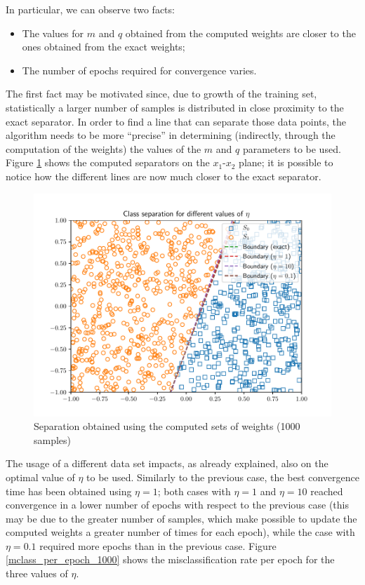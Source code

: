 \documentclass[letterpaper,headings=standardclasses]{scrartcl}
\begin{document}
In particular, we can observe two facts:

\begin{itemize}

\item The values for $m$ and $q$ obtained from the computed weights are closer to the ones obtained from the exact weights;

\item The number of epochs required for convergence varies.

\end{itemize}

The first fact may be motivated since, due to growth of the training set, statistically a larger number of samples is distributed in close proximity to the exact separator. In order to find a line that can separate those data points, the algorithm needs to be more “precise” in determining (indirectly, through the computation of the weights) the values of the $m$ and $q$ parameters to be used. Figure \ref{all_sep_1000} shows the computed separators on the $x_1$-$x_2$ plane; it is possible to notice how the different lines are now much closer to the exact separator.

\begin{figure}[h]
\centering
\includegraphics[width=0.7\linewidth]{all_sep_1000.pdf}
\caption{Separation obtained using the computed sets of weights (1000 samples)}
\label{all_sep_1000}
\end{figure}

The usage of a different data set impacts, as already explained, also on the optimal value of $\eta$ to be used. Similarly to the previous case, the best convergence time has been obtained using $\eta = 1$; both cases with $\eta = 1$ and $\eta = 10$ reached convergence in a lower number of epochs with respect to the previous case (this may be due to the greater number of samples, which make possible to update the computed weights a greater number of times for each epoch), while the case with $\eta = 0.1$ required more epochs than in the previous case. Figure \ref{mclass_per_epoch_1000} shows the misclassification rate per epoch for the three values of $\eta$.
\end{document}

